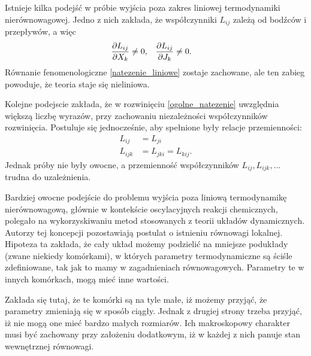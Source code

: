 \documentclass[10pt, a4paper, twoside, onecolumn]{article}
\numberwithin{equation}{section}
\begin{document}
	Istnieje kilka podejść w próbie wyjścia poza zakres liniowej termodynamiki nierównowagowej. Jedno z nich zakłada, że współczynniki \(L_{ij}\) zależą od bodźców i przepływów, a więc
	\begin{align}
		& \pdv{L_{ij}}{X_{k}}\neq 0, && \pdv{L_{ij}}{J_{k}}\neq 0.
	\end{align}
	Równanie fenomenologiczne \eqref{natezenie_liniowe} zostaje zachowane, ale ten zabieg powoduje, że teoria staje się nieliniowa. \par
	Kolejne podejscie zakłada, że w rozwinięciu \eqref{ogolne_natezenie} uwzględnia większą liczbę wyrazów, przy zachowaniu niezależności współczynników rozwinięcia. Postuluje się jednocześnie, aby spełnione były relacje przemienności:
	\begin{equation}
	\begin{split}
		L_{ij} &= L_{ji} \\
		L_{ijk} &= L_{jki} = L_{kij}.
	\end{split}
	\end{equation}
	Jednak próby nie były owocne, a przemienność współczynników \(L_{ij}, L_{ijk}, \ldots\) trudna do uzależnienia. \par
	Bardziej owocne podejście do problemu wyjścia poza liniową termodynamikę nierównowagową, głównie w kontekście oscylacyjnych reakcji chemicznych, polegało na wykorzyskiwaniu metod stosowanych z teorii układów dynamicznych. Autorzy tej koncepcji pozostawiają postulat o istnieniu równowagi lokalnej. Hipoteza ta zakłada, że cały układ możemy podzielić na mniejsze podukłady (zwane niekiedy komórkami), w których parametry termodynamiczne są ściśle zdefiniowane, tak jak to mamy w zagadnieniach równowagowych. Parametry te w innych komórkach, mogą mieć inne wartości. \par
	Zakłada się tutaj, że te komórki są na tyle małe, iż możemy przyjąć, że parametry zmieniają się w sposób ciągły. Jednak z drugiej strony trzeba przyjąć, iż nie mogą one mieć bardzo małych rozmiarów. Ich makroskopowy charakter musi być zachowany przy założeniu dodatkowym, iż w każdej z nich panuje stan wewnętrznej równowagi. \par
	
\end{document}
